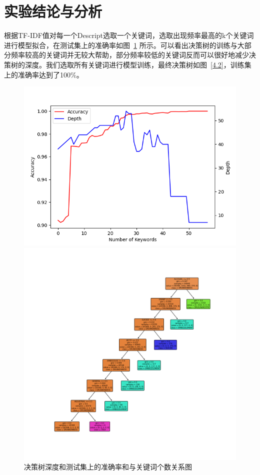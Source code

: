 \documentclass[a4paper,12pt]{report}
\begin{document}
\section{实验结论与分析}
\par 根据TF-IDF值对每一个Descript选取一个关键词，选取出现频率最高的k个关键词进行模型拟合，在测试集上的准确率如图~\ref{4.1} 所示。可以看出决策树的训练与大部分频率较高的关键词并无较大帮助，部分频率较低的关键词反而可以很好地减少决策树的深度。我们选取所有关键词进行模型训练，最终决策树如图~\ref{4.2}，训练集上的准确率达到了100\%。
\begin{figure}[htbp]
    \centering
    \begin{minipage}{0.42\textwidth}
        \centering
        \includegraphics[width=\textwidth]{../datasets/exp4/accuracy+depth.png}
        \caption{决策树深度和测试集上的准确率和与关键词个数关系图}
        \label{4.1}
    \end{minipage}
    \hfill
    \begin{minipage}{0.42\textwidth}
        \centering
        \includegraphics[width=\textwidth]{../datasets/exp4/decision_tree.png}

\end{minipage}
\end{figure}
\end{document}
